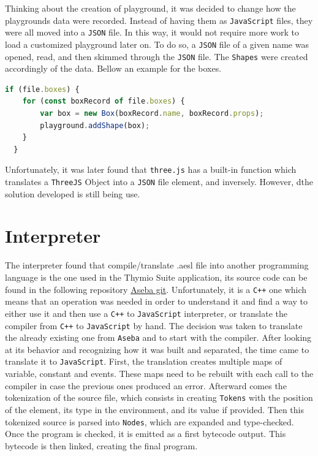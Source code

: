 \documentclass{scrreprt}
\begin{document}
Thinking about the creation of playground, it was decided to change how the playgrounds data were recorded. Instead of having them as \texttt{JavaScript} files, they were all moved into a \texttt{JSON} file. In this way, it would not require more work to load a 
customized playground later on. To do so, a \texttt{JSON} file of a given name was opened, read, and then skimmed through the \texttt{JSON} file. The \texttt{Shapes} were created accordingly of the data. Bellow an example for the boxes.

\begin{lstlisting}[language=JavaScript, gobble=2, basicstyle=\ttfamily\small]
  if (file.boxes) {
    for (const boxRecord of file.boxes) {
        var box = new Box(boxRecord.name, boxRecord.props);
        playground.addShape(box);
    }
  }
\end{lstlisting} 

Unfortunately, it was later found that \texttt{three.js} has a built-in function which translates a \texttt{ThreeJS} Object into a \texttt{JSON} file element, and inversely. However, dthe solution developed is still being use.

\section{Interpreter}

The interpreter found that compile/translate .aesl file into another programming language is the one used in the Thymio Suite application, its source code can be found in the following repository \href{https://github.com/aseba-community/aseba/tree/master/aseba/compiler}{Aseba git}.
Unfortunately, it is a \texttt{C++} one which means that an operation was needed in order to understand it and find a way to either use it and then use a \texttt{C++} to \texttt{JavaScript} interpreter, or translate the compiler from \texttt{C++} to \texttt{JavaScript} by hand.
The decision was taken to translate the already existing one from \texttt{Aseba} and to start with the compiler. After looking at its behavior and recognizing how it was built and separated,
the time came to translate it to \texttt{JavaScript}. First, the translation creates multiple maps of variable, constant and events. These maps need to be rebuilt with each call to the compiler in case the previous ones produced an error.
Afterward comes the tokenization of the source file, which consists in creating \texttt{Tokens} with the position of the element, its type in the environment, and its value if provided. Then this tokenized source is parsed into \texttt{Nodes}, 
which are expanded and type-checked. Once the program is checked, it is emitted as a first bytecode output. This bytecode is then linked, creating the final program.
\end{document}
